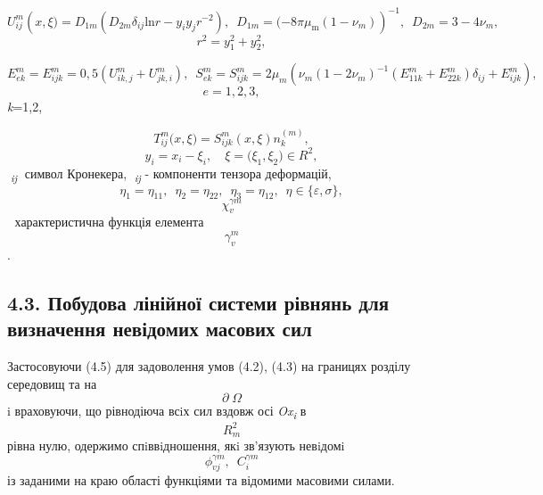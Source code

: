 \[{U_{\mathit{\text{ij}}}^{m}(x,\xi{) = D_{1m}}(D_{2m}\delta_{\mathit{\text{ij}}}\text{ln}{r - y_{i}}y_{j}r^{- 2}),\mspace{9mu}{D_{1m} = {( - 8}}\mathit{\text{πμ}_{\mathrm{m}}}({1 - \nu_{m}}))^{- 1},\mspace{9mu}{D_{2m} = {3 - 4}}\nu_{m},}{}\]
\[{{r^{2} = {y_{1}^{2} + y_{2}^{2}}},}{}\]

\[{{E_{\mathit{\text{ek}}}^{m} = E_{\mathit{\text{ijk}}}^{m} = 0,5}({U_{\mathit{\text{ik}},j}^{m} + U_{\mathit{\text{jk}},i}^{m}}),\mspace{9mu}{S_{\mathit{\text{ek}}}^{m} = S_{\mathit{\text{ijk}}}^{m} = 2}\mu_{m}(\nu_{m}({1 - 2}\nu_{m})^{- 1}({E_{\text{11}k}^{m} + E_{\text{22}k}^{m}}){\delta_{\mathit{\text{ij}}} + E_{\mathit{\text{ijk}}}^{m}}),}{}\]\[{{e = 1,2,3},}{}\]\emph{
k}=1,2,

\[{T_{\mathit{\text{ij}}}^{m}(x,\xi{) = S_{\mathit{\text{ijk}}}^{m}}(x,\xi)n_{k}^{(m)},}{}\]\[{{y_{i} = {x_{i} - \xi_{i}}},\quad{\xi = (}\xi_{1},\xi_{2})\in R^{2},}{}\]\emph{}\textsubscript{\emph{ij}}
символ Кронекера, \emph{}\textsubscript{\emph{ij}} - компоненти
тензора деформацій,\emph{
}\[{{\eta_{1} = \eta_{\text{11}}},\mspace{9mu}{\eta_{2} = \eta_{\text{22}}},\mspace{9mu}{\eta_{3} = \eta_{\text{12}}},\mspace{9mu}\eta\in{\{{\varepsilon,\sigma}\}},}{}\]\textsubscript{
}\[\chi_{v}^{\mathit{\gamma m}}{}\]  характе­ристична функція елемента
\[\gamma_{v}^{m}{}\].

\hypertarget{ux43fux43eux431ux443ux434ux43eux432ux430-ux43bux456ux43dux456ux439ux43dux43eux457-ux441ux438ux441ux442ux435ux43cux438-ux440ux456ux432ux43dux44fux43dux44c-ux434ux43bux44f-ux432ux438ux437ux43dux430ux447ux435ux43dux43dux44f-ux43dux435ux432ux456ux434ux43eux43cux438ux445-ux43cux430ux441ux43eux432ux438ux445-ux441ux438ux43b}{%
\subsection[4.3. Побудова лінійної системи рівнянь для визначення
невідомих масових
сил]{\texorpdfstring{\protect\hypertarget{anchor-56}{}{}4.3. Побудова
лінійної системи рівнянь для визначення невідомих масових
сил}{4.3. Побудова лінійної системи рівнянь для визначення невідомих масових сил}}\label{ux43fux43eux431ux443ux434ux43eux432ux430-ux43bux456ux43dux456ux439ux43dux43eux457-ux441ux438ux441ux442ux435ux43cux438-ux440ux456ux432ux43dux44fux43dux44c-ux434ux43bux44f-ux432ux438ux437ux43dux430ux447ux435ux43dux43dux44f-ux43dux435ux432ux456ux434ux43eux43cux438ux445-ux43cux430ux441ux43eux432ux438ux445-ux441ux438ux43b}}

Застосовуючи (4.5) для задоволення умов (4.2), (4.3) на границях розділу
середовищ та на \[{\partial \Omega}{}\] i враховуючи, що рівнодіюча
всiх сил вздовж осі \emph{Ox}\textsubscript{\emph{i}}\emph{
}в\[R_{m}^{2}{}\] рівна нулю, одержи­мо спiввiдношення, якi зв'язують
невiдомi
\[{\phi_{\mathit{\text{vj}}}^{\mathit{\gamma m}},\mspace{9mu} C_{i}^{\mathit{\gamma m}}}{}\]
із заданими на краю області функціями та відомими масовими силами.

